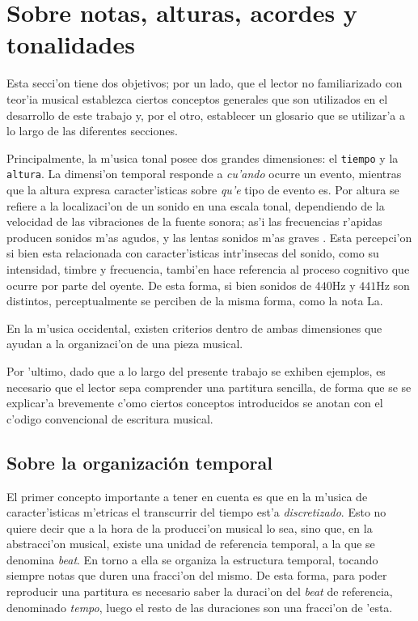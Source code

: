 \section{Sobre notas, alturas, acordes y tonalidades}
\label{sec:musical_intro}
Esta secci'on tiene dos objetivos; por un lado, que el lector no familiarizado con teor'ia musical establezca
ciertos conceptos generales que son utilizados en el desarrollo de este trabajo y, por el otro, establecer un glosario
que se utilizar'a a lo largo de las diferentes secciones.

Principalmente, la m'usica tonal posee dos grandes dimensiones: el \texttt{tiempo} y la \texttt{altura}. 
La dimensi'on temporal responde a \emph{cu'ando} ocurre un evento, mientras que la altura expresa caracter'isticas sobre \emph{qu'e}
tipo de evento es. Por altura se refiere a la localizaci'on de un sonido en una escala tonal, dependiendo de la velocidad de las vibraciones de la fuente sonora; 
as'i las frecuencias r'apidas producen sonidos m'as agudos, y las lentas sonidos m'as graves \citep[p. 565]{kennedy1996oxford}.
Esta percepci'on si bien esta relacionada con caracter'isticas intr'insecas del sonido, como su intensidad, timbre y frecuencia, 
tambi'en hace referencia
al proceso cognitivo que ocurre por parte del oyente. De esta forma, si bien sonidos de $440\mbox{Hz}$ y $441\mbox{Hz}$ son distintos, 
perceptualmente se perciben de la misma forma, como la nota La.

En la m'usica occidental, existen criterios dentro de ambas dimensiones que ayudan a la organizaci'on de una pieza musical. 

Por 'ultimo, dado que a lo largo del presente trabajo se exhiben ejemplos, es necesario que el lector sepa comprender una partitura sencilla, 
de forma que se se explicar'a brevemente c'omo ciertos conceptos introducidos se anotan con el c'odigo convencional de escritura musical.

\subsection{Sobre la organizaci\'on temporal}
\label{sec:temporal_organization}

El primer concepto importante a tener en cuenta es que en la m'usica de caracter'isticas m'etricas el transcurrir del tiempo est'a \emph{discretizado}. Esto no quiere decir que a la hora de la producci'on musical lo sea, sino que, 
en la abstracci'on musical, existe una unidad de referencia temporal, a la que se denomina \emph{beat}. En torno a ella se organiza la estructura temporal, tocando
siempre notas que duren una fracci'on del mismo. De esta forma, para poder reproducir una partitura es necesario saber 
la duraci'on del \emph{beat} de referencia, denominado \emph{tempo}, luego el resto de las duraciones son una fracci'on de 'esta.


